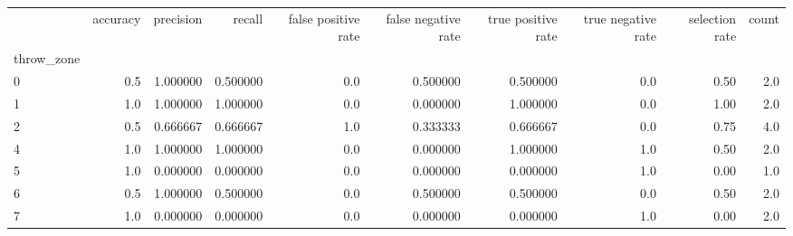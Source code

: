 \begin{tabular}{lrrrrrrrrr}
\toprule
{} &  accuracy &  precision &    recall &  false positive rate &  false negative rate &  true positive rate &  true negative rate &  selection rate &  count \\
throw\_zone &           &            &           &                      &                      &                     &                     &                 &        \\
\midrule
0          &       0.5 &   1.000000 &  0.500000 &                  0.0 &             0.500000 &            0.500000 &                 0.0 &            0.50 &    2.0 \\
1          &       1.0 &   1.000000 &  1.000000 &                  0.0 &             0.000000 &            1.000000 &                 0.0 &            1.00 &    2.0 \\
2          &       0.5 &   0.666667 &  0.666667 &                  1.0 &             0.333333 &            0.666667 &                 0.0 &            0.75 &    4.0 \\
4          &       1.0 &   1.000000 &  1.000000 &                  0.0 &             0.000000 &            1.000000 &                 1.0 &            0.50 &    2.0 \\
5          &       1.0 &   0.000000 &  0.000000 &                  0.0 &             0.000000 &            0.000000 &                 1.0 &            0.00 &    1.0 \\
6          &       0.5 &   1.000000 &  0.500000 &                  0.0 &             0.500000 &            0.500000 &                 0.0 &            0.50 &    2.0 \\
7          &       1.0 &   0.000000 &  0.000000 &                  0.0 &             0.000000 &            0.000000 &                 1.0 &            0.00 &    2.0 \\
\bottomrule
\end{tabular}
